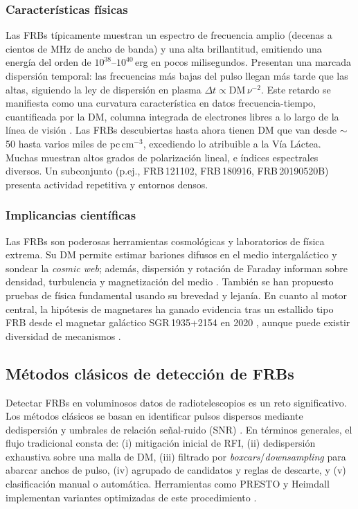 \subsubsection{Características físicas} Las FRBs típicamente muestran un espectro de frecuencia amplio 
(decenas a cientos de MHz de ancho de banda) y una alta brillantitud, emitiendo una energía del orden 
de $10^{38}$--$10^{40}$\,erg en pocos milisegundos. Presentan una marcada dispersión temporal: las 
frecuencias más bajas del pulso llegan más tarde que las altas, siguiendo la ley de dispersión en 
plasma $\Delta t \propto \mathrm{DM}\,\nu^{-2}$. Este retardo se manifiesta como una curvatura 
característica en datos frecuencia-tiempo, cuantificada por la DM, columna integrada de electrones 
libres a lo largo de la línea de visión \citep{LorimerKramer2004}. Las FRBs descubiertas hasta ahora 
tienen DM que van desde $\sim$50 hasta varios miles de pc\,cm$^{-3}$, excediendo lo atribuible a la 
Vía Láctea. Muchas muestran altos grados de polarización lineal, e índices espectrales diversos. 
Un subconjunto (p.ej., FRB\,121102, FRB\,180916, FRB\,20190520B) presenta actividad repetitiva y 
entornos densos.

\subsubsection{Implicancias científicas} Las FRBs son poderosas herramientas cosmológicas y 
laboratorios de física extrema. Su DM permite estimar bariones difusos en el medio intergaláctico 
y sondear la \textit{cosmic web}; además, dispersión y rotación de Faraday informan sobre densidad, 
turbulencia y magnetización del medio \citep{Petroff_2022,Masui2015,Shirasaki2021}. También se han propuesto pruebas de física fundamental usando su brevedad y lejanía. En cuanto al motor central, la hipótesis de magnetares ha ganado evidencia tras un estallido tipo FRB desde el magnetar galáctico SGR\,1935+2154 en 2020 \citep{Bochenek2020,CHIME_SGR2020}, aunque puede existir diversidad de mecanismos \citep{Zhang_2020}.

\subsection{Métodos clásicos de detección de FRBs}

Detectar FRBs en voluminosos datos de radiotelescopios es un reto significativo. 
Los métodos clásicos se basan en identificar pulsos dispersos mediante de\-dispersión 
y umbrales de relación señal-ruido (SNR) \citep{CordesMcLaughlin2003}. En términos generales, 
el flujo tradicional consta de: (i) mitigación inicial de RFI, (ii) de\-dispersión exhaustiva 
sobre una malla de DM, (iii) filtrado por \textit{boxcars}/\textit{downsampling} para abarcar 
anchos de pulso, (iv) agrupado de candidatos y reglas de descarte, y (v) clasificación manual o 
automática. Herramientas como PRESTO y Heimdall implementan variantes optimizadas de este procedimiento
\citep{Ransom_2003,Barsdell_2012,Heimdall_Use}.

